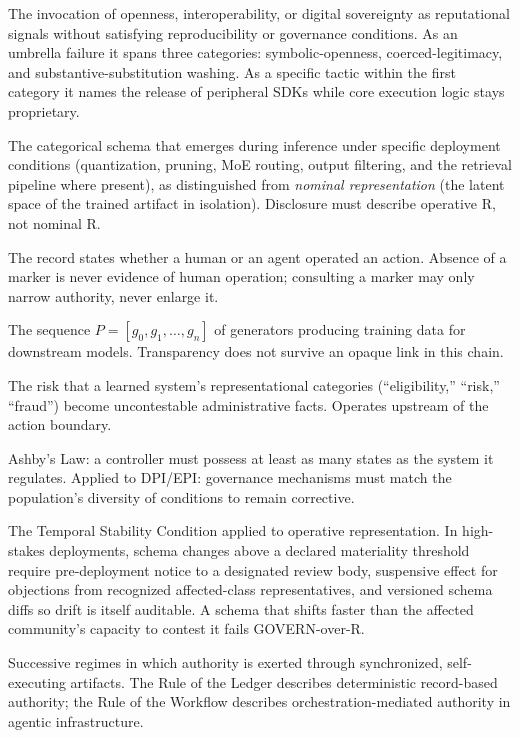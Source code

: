 \begin{description}[style=nextline, leftmargin=1.5em, font=\normalfont\bfseries]
The invocation of openness, interoperability, or digital sovereignty
as reputational signals without satisfying reproducibility or
governance conditions. As an umbrella failure it spans three
categories: symbolic-openness, coerced-legitimacy, and
substantive-substitution washing. As a specific tactic within the
first category it names the release of peripheral SDKs while core
execution logic stays proprietary.

The categorical schema that emerges during inference under specific
deployment conditions (quantization, pruning, MoE routing, output
filtering, and the retrieval pipeline where present), as distinguished
from \textit{nominal representation} (the latent space of the trained
artifact in isolation). Disclosure must describe operative R, not
nominal R.

The record states whether a human or an agent operated an action.
Absence of a marker is never evidence of human operation; consulting a
marker may only narrow authority, never enlarge it.

The sequence $P = [g_0, g_1, \ldots, g_n]$ of generators producing
training data for downstream models. Transparency does not survive an
opaque link in this chain.

The risk that a learned system's representational categories
(``eligibility,'' ``risk,'' ``fraud'') become uncontestable
administrative facts. Operates upstream of the action boundary.

Ashby's Law: a controller must possess at least as many states as the
system it regulates. Applied to DPI/EPI: governance mechanisms must
match the population's diversity of conditions to remain corrective.

The Temporal Stability Condition applied to operative representation.
In high-stakes deployments, schema changes above a declared materiality
threshold require pre-deployment notice to a designated review body,
suspensive effect for objections from recognized affected-class
representatives, and versioned schema diffs so drift is itself
auditable. A schema that shifts faster than the affected community's
capacity to contest it fails GOVERN-over-R.

Successive regimes in which authority is exerted through synchronized,
self-executing artifacts. The Rule of the Ledger describes
deterministic record-based authority; the Rule of the Workflow
describes orchestration-mediated authority in agentic infrastructure.


\end{description}
